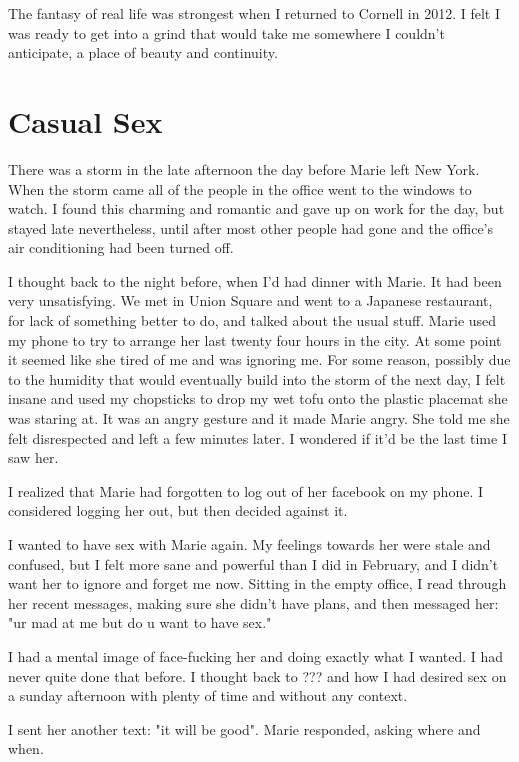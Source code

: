 \documentclass[12pt]{memoir}
\begin{document}
The fantasy of real life was strongest when I returned to Cornell in 2012.
I felt I was ready to get into a grind that would take me somewhere I couldn't
anticipate, a place of beauty and continuity.  

\chapter{Casual Sex}

There was a storm in the late afternoon the day before Marie left New York.
When the storm came all of the people in the office went to the windows to
watch.  I found this charming and romantic and gave up on work for the day, but
stayed late nevertheless, until after most other people had gone and the
office's air conditioning had been turned off.  

I thought back to the night before, when I'd had dinner with Marie.  It had been
very unsatisfying.  We met in Union Square and went to a Japanese restaurant,
for lack of something better to do, and talked about the usual stuff.  Marie
used my phone to try to arrange her last twenty four hours in the city.  At some
point it seemed like she tired of me and was ignoring me.  For some reason,
possibly due to the humidity that would eventually build into the storm of the
next day, I felt insane and used my chopsticks to drop my wet tofu onto the
plastic placemat she was staring at.  It was an angry gesture and it made Marie
angry.  She told me she felt disrespected and left a few minutes later.  I
wondered if it'd be the last time I saw her.

I realized that Marie had forgotten to log out of her facebook on my phone.  I
considered logging her out, but then decided against it.

I wanted to have sex with Marie again.  My feelings towards her were stale and
confused, but I felt more sane and powerful than I did in February, and I didn't
want her to ignore and forget me now.  Sitting in the empty office, I read
through her recent messages, making sure she didn't have plans, and then
messaged her: "ur mad at me but do u want to have sex."

I had a mental image of face-fucking her and doing exactly what I wanted.  I had
never quite done that before.  I thought back to ??? and how I had desired sex
on a sunday afternoon with plenty of time and without any context.  

I sent her another text: "it will be good".  Marie responded, asking where and
when.
\end{document}
